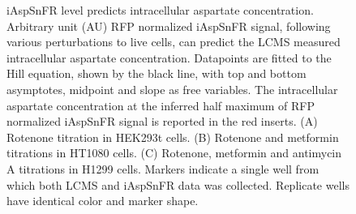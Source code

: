 \documentclass[9pt,lineno]{elife}
\begin{document}
\begin{figure}[ht!]
\centering
{}
\caption{
iAspSnFR level predicts intracellular aspartate concentration.
Arbitrary unit (AU) RFP normalized iAspSnFR signal, following various perturbations to live cells, can predict the LCMS measured intracellular aspartate concentration.
Datapoints are fitted to the Hill equation, shown by the black line, with top and bottom asymptotes, midpoint and slope as free variables.
The intracellular aspartate concentration at the inferred half maximum of RFP normalized iAspSnFR signal is reported in the red inserts.
(A) Rotenone titration in HEK293t cells.
(B) Rotenone and metformin titrations in HT1080 cells.
(C) Rotenone, metformin and antimycin A titrations in H1299 cells.
Markers indicate a single well from which both LCMS and iAspSnFR data was collected.
Replicate wells have identical color and marker shape.
}
\label{fig:Fig3}
\label{figsupp:f3S1}
\end{figure}
\end{document}
